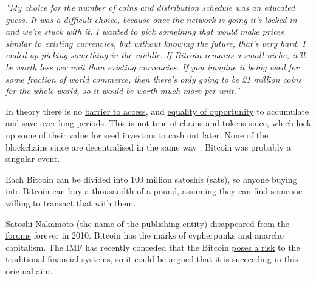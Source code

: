 \textit{''My choice for the number of coins and distribution schedule was an educated guess.  It was a difficult choice, because once the network is going it's locked in and we're stuck with it.  I wanted to pick something that would make prices similar to existing currencies, but without knowing the future, that's very hard.  I ended up picking something in the middle.  If Bitcoin remains a small niche, it'll be worth less per unit than existing currencies.  If you imagine it being used for some fraction of world commerce, then there's only going to be 21 million coins for the whole world, so it would be worth much more per unit.''}\par
In theory there is no \href{https://www.forbes.com/sites/peterizzo/2021/09/29/against-cryptocurrency-the-ethical-argument-for-bitcoin-maximalism/?}{barrier to access}, and \href{https://www.coindesk.com/layer2/2022/02/16/why-bitcoin-is-a-tool-for-social-justice/}{equality of opportunity} to accumulate and save over long periods. This is not true of chains and tokens since, which lock up some of their value for seed investors to cash out later. None of the blockchains since are decentralised in the same way \cite{selvam2021blockchain}. Bitcoin was probably a \href{https://danhedl.medium.com/bitcoins-distribution-was-fair-e2ef7bbbc892}{singular event}.\par
Each Bitcoin can be divided into 100 million satoshis (sats), so anyone buying into Bitcoin can buy a thousandth of a pound, assuming they can find someone willing to transact that with them. \par
Satoshi Nakamoto (the name of the publishing entity) \href{https://bitcoinmagazine.com/technical/what-happened-when-bitcoin-creator-satoshi-nakamoto-disappeared}{disappeared from the forums} forever in 2010. Bitcoin has the marks of cypherpunks and anarcho capitalism. The IMF has recently conceded that the Bitcoin \href{https://blogs.imf.org/2022/01/11/crypto-prices-move-more-in-sync-with-stocks-posing-new-risks/}{poses a risk} to the traditional financial systems, so it could be argued that it is succeeding in this original aim.\par
